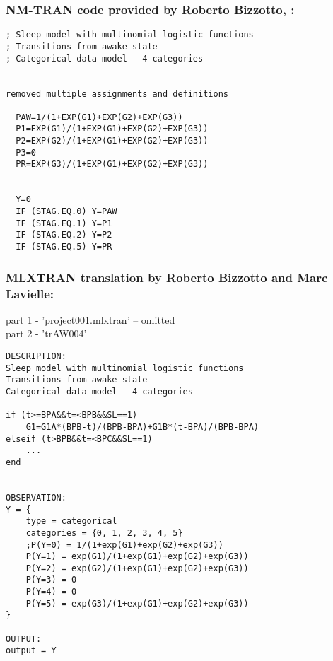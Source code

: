 


\subsubsection{NM-TRAN code provided by Roberto Bizzotto, \cite{Bizzotto:2011fk}:}

\myStartLine

\lstset{language=NONMEMdataSet}
\begin{lstlisting}
; Sleep model with multinomial logistic functions
; Transitions from awake state
; Categorical data model - 4 categories


removed multiple assignments and definitions

  PAW=1/(1+EXP(G1)+EXP(G2)+EXP(G3))
  P1=EXP(G1)/(1+EXP(G1)+EXP(G2)+EXP(G3))
  P2=EXP(G2)/(1+EXP(G1)+EXP(G2)+EXP(G3))
  P3=0
  PR=EXP(G3)/(1+EXP(G1)+EXP(G2)+EXP(G3))


  Y=0
  IF (STAG.EQ.0) Y=PAW
  IF (STAG.EQ.1) Y=P1
  IF (STAG.EQ.2) Y=P2
  IF (STAG.EQ.5) Y=PR

\end{lstlisting}

\myEndLine

\subsubsection{MLXTRAN translation by Roberto Bizzotto and Marc Lavielle:}
part 1 - 'project001.mlxtran'  -- omitted \\
part 2 - 'trAW004'

\myStartLine

\lstset{language=MLXTRANcode}
\begin{lstlisting}
DESCRIPTION:
Sleep model with multinomial logistic functions
Transitions from awake state
Categorical data model - 4 categories

if (t>=BPA&&t=<BPB&&SL==1)
	G1=G1A*(BPB-t)/(BPB-BPA)+G1B*(t-BPA)/(BPB-BPA)
elseif (t>BPB&&t=<BPC&&SL==1)
	...
end


OBSERVATION:
Y = {
	type = categorical
	categories = {0, 1, 2, 3, 4, 5}
	;P(Y=0) = 1/(1+exp(G1)+exp(G2)+exp(G3))
	P(Y=1) = exp(G1)/(1+exp(G1)+exp(G2)+exp(G3))
	P(Y=2) = exp(G2)/(1+exp(G1)+exp(G2)+exp(G3))
	P(Y=3) = 0
	P(Y=4) = 0
	P(Y=5) = exp(G3)/(1+exp(G1)+exp(G2)+exp(G3))
}

OUTPUT:
output = Y
\end{lstlisting}

